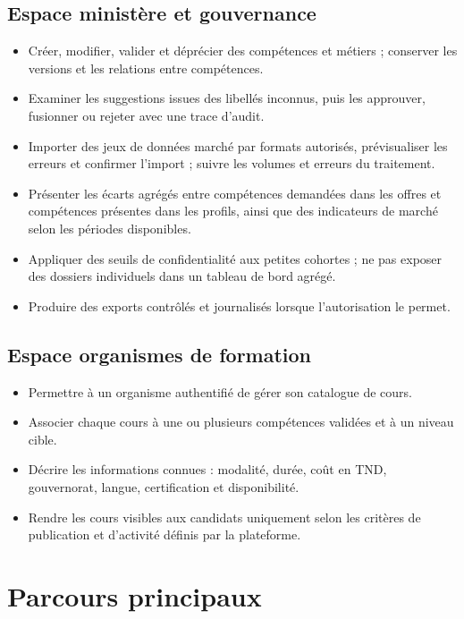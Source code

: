 \documentclass[11pt,a4paper]{article}
\begin{document}
\subsection{Espace ministère et gouvernance}
\begin{itemize}
  \item Créer, modifier, valider et déprécier des compétences et métiers ; conserver les versions et les relations entre compétences.
  \item Examiner les suggestions issues des libellés inconnus, puis les approuver, fusionner ou rejeter avec une trace d'audit.
  \item Importer des jeux de données marché par formats autorisés, prévisualiser les erreurs et confirmer l'import ; suivre les volumes et erreurs du traitement.
  \item Présenter les écarts agrégés entre compétences demandées dans les offres et compétences présentes dans les profils, ainsi que des indicateurs de marché selon les périodes disponibles.
  \item Appliquer des seuils de confidentialité aux petites cohortes ; ne pas exposer des dossiers individuels dans un tableau de bord agrégé.
  \item Produire des exports contrôlés et journalisés lorsque l'autorisation le permet.
\end{itemize}

\subsection{Espace organismes de formation}
\begin{itemize}
  \item Permettre à un organisme authentifié de gérer son catalogue de cours.
  \item Associer chaque cours à une ou plusieurs compétences validées et à un niveau cible.
  \item Décrire les informations connues : modalité, durée, coût en TND, gouvernorat, langue, certification et disponibilité.
  \item Rendre les cours visibles aux candidats uniquement selon les critères de publication et d'activité définis par la plateforme.
\end{itemize}

\section{Parcours principaux}
\end{document}
